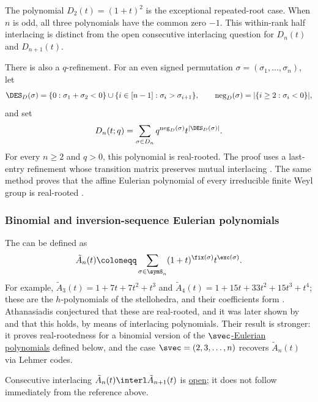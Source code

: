 \begin{example*}
The polynomial $D_2(t)=(1+t)^2$ is the exceptional repeated-root case.
When $n$ is odd, all three polynomials have the common zero $-1$.  This
within-rank half interlacing is distinct from the open consecutive
interlacing question for $D_n(t)$ and $D_{n+1}(t)$.

There is also a $q$-refinement.  For an even signed permutation
$\sigma=(\sigma_1,\dotsc,\sigma_n)$, let
\[
 \DES_D(\sigma)=
 \{0:\sigma_1+\sigma_2<0\}
 \cup\{i\in[n-1]:\sigma_i>\sigma_{i+1}\},
 \qquad
 \operatorname{neg}_D(\sigma)=|\{i\geq2:\sigma_i<0\}|,
\]
and set
\[
 D_n(t;q)=\sum_{\sigma\in D_n}
 q^{\operatorname{neg}_D(\sigma)}t^{|\DES_D(\sigma)|}.
\]
For every $n\geq2$ and $q>0$, this polynomial is real-rooted.  The proof
uses a last-entry refinement whose transition matrix preserves mutual
interlacing \cite[Thm.~3.8]{YangZhang2014x}.  The same method proves that
the affine Eulerian polynomial of every irreducible finite Weyl group is
real-rooted \cite[Thm.~4.6]{YangZhang2014x}.
\end{example*}




\subsubsection[inversionSequenceEulerianRealRooted]{Binomial and inversion-sequence Eulerian polynomials}

\begin{example*}

The \label{binomialEulerianPolynomial}
can be defined as
\[
 \tilde{A}_n(t) \coloneqq \sum_{\sigma \in \symS_n} (1+t)^{\fix(\sigma)} t^{\exc(\sigma)}.
\]
For example, $\tilde{A}_3(t)=1+7t+7t^2+t^3$ and
$\tilde{A}_4(t)=1+15t+33t^2+15t^3+t^4$; these are the $h$-polynomials of the
stellohedra, and their coefficients form .
Athanasiadis conjectured that these are real-rooted,
and it was later shown by  and
 \cite{HaglundZhang2019} that this holds,
by means of interlacing polynomials.  Their result is stronger: it proves
real-rootedness for a binomial version of the
\hyperref[sEulerianPolynomial]{$\svec$-Eulerian polynomials} defined below,
and the case \(\svec=(2,3,\dotsc,n)\) recovers \(\tilde{A}_n(t)\) via
Lehmer codes.

Consecutive interlacing $\tilde{A}_n(t) \interl \tilde{A}_{n+1}(t)$ is
\hyperref[conjBinomialEulerianInterlacing]{open}; it does not follow
immediately from the reference above.
\end{example*}


